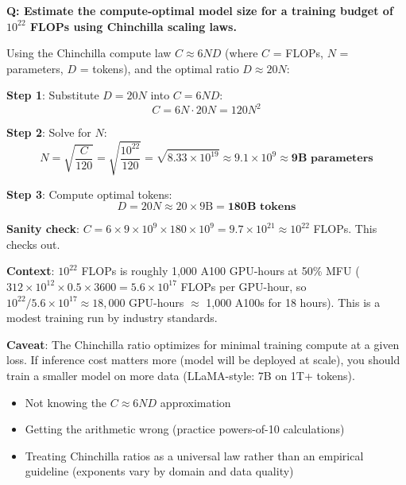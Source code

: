 \begin{interviewq}
\textbf{Q: Estimate the compute-optimal model size for a training budget of $10^{22}$ FLOPs using Chinchilla scaling laws.}

 \quad {} \quad \badgefreq{\freqhigh}

\stronganswer
Using the Chinchilla compute law $C \approx 6ND$ (where $C$ = FLOPs, $N$ = parameters, $D$ = tokens), and the optimal ratio $D \approx 20N$:

\textbf{Step 1}: Substitute $D = 20N$ into $C = 6ND$:
\[C = 6N \cdot 20N = 120N^2\]

\textbf{Step 2}: Solve for $N$:
\[N = \sqrt{\frac{C}{120}} = \sqrt{\frac{10^{22}}{120}} = \sqrt{8.33 \times 10^{19}} \approx 9.1 \times 10^9 \approx \textbf{9B parameters}\]

\textbf{Step 3}: Compute optimal tokens:
\[D = 20N \approx 20 \times 9\text{B} = \textbf{180B tokens}\]

\textbf{Sanity check}: $C = 6 \times 9 \times 10^9 \times 180 \times 10^9 = 9.7 \times 10^{21} \approx 10^{22}$ FLOPs. This checks out.

\textbf{Context}: $10^{22}$ FLOPs is roughly 1,000 A100 GPU-hours at 50\% MFU ($312 \times 10^{12} \times 0.5 \times 3600 = 5.6 \times 10^{17}$ FLOPs per GPU-hour, so $10^{22} / 5.6 \times 10^{17} \approx 18{,}000$ GPU-hours $\approx$ 1,000 A100s for 18 hours). This is a modest training run by industry standards.

\textbf{Caveat}: The Chinchilla ratio optimizes for minimal training compute at a given loss. If inference cost matters more (model will be deployed at scale), you should train a smaller model on more data (LLaMA-style: 7B on 1T+ tokens).

\redflags
\begin{itemize}
    \item Not knowing the $C \approx 6ND$ approximation
    \item Getting the arithmetic wrong (practice powers-of-10 calculations)
    \item Treating Chinchilla ratios as a universal law rather than an empirical guideline (exponents vary by domain and data quality)
\end{itemize}



\end{interviewq}
